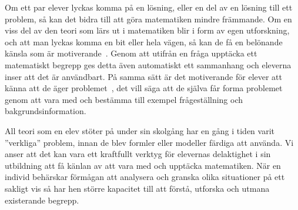 
\label{sec:delaktighet}
\textcolor{WildStrawberry}{
    Om ett par elever lyckas komma på en lösning, eller en del av en lösning till ett problem, så kan det bidra till att göra matematiken mindre främmande. Om en viss del av den teori som lärs ut i matematiken blir i form av egen utforskning, och att man lyckas komma en bit eller hela vägen, så kan de få en belönande känsla som är motiverande~\cite{TheElephant}.} \textcolor{lila}{Genom att utifrån en fråga upptäcka ett matematiskt begrepp ges detta även automatiskt ett sammanhang och eleverna inser att det är användbart. På samma sätt är det motiverande för elever att känna att de äger problemet~\cite{TheElephant}, det vill säga att de själva får forma problemet genom att vara med och bestämma till exempel frågeställning och bakgrundsinformation. }
    
\textcolor{WildStrawberry}{
    All teori som en elev stöter på under sin skolgång har en gång i tiden varit ''verkliga'' problem, innan de blev formler eller modeller färdiga att använda. Vi anser att det kan vara ett kraftfullt verktyg för elevernas delaktighet i sin utbildning att få känlan av att vara med och upptäcka matematiken. När en individ behärskar förmågan att analysera och granska olika situationer på ett sakligt vis så har hen större kapacitet till att förstå, utforska och utmana existerande begrepp. }
    
        
        
% 